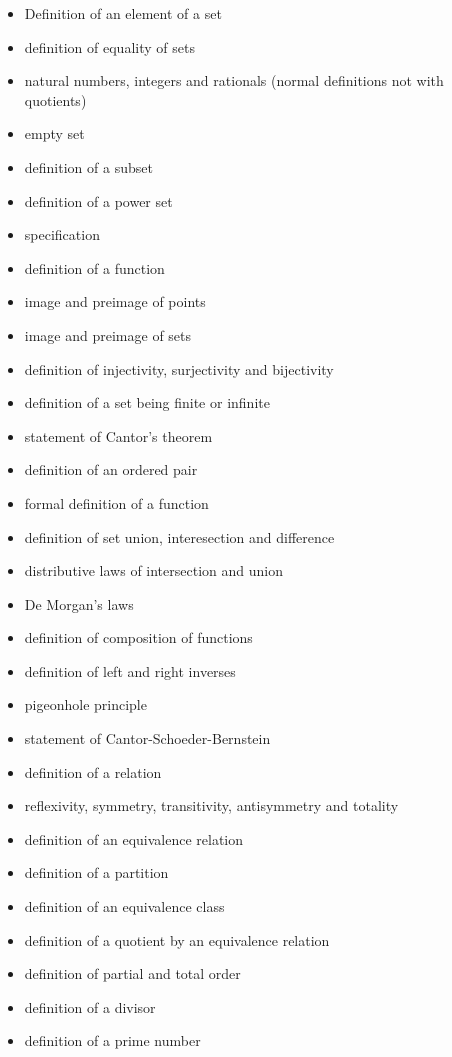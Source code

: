 \documentclass[
]{book}
\providecommand{\tightlist}{%
  \setlength{\itemsep}{0pt}\setlength{\parskip}{0pt}}
\theoremstyle{definition}
\theoremstyle{definition}
\theoremstyle{definition}
\theoremstyle{definition}
\theoremstyle{remark}
\begin{document}
\begin{itemize}
\tightlist
\item
  Definition of an element of a set
\item
  definition of equality of sets
\item
  natural numbers, integers and rationals (normal definitions not with quotients)
\item
  empty set
\item
  definition of a subset
\item
  definition of a power set
\item
  specification
\item
  definition of a function
\item
  image and preimage of points
\item
  image and preimage of sets
\item
  definition of injectivity, surjectivity and bijectivity
\item
  definition of a set being finite or infinite
\item
  statement of Cantor's theorem
\item
  definition of an ordered pair
\item
  formal definition of a function
\item
  definition of set union, interesection and difference
\item
  distributive laws of intersection and union
\item
  De Morgan's laws
\item
  definition of composition of functions
\item
  definition of left and right inverses
\item
  pigeonhole principle
\item
  statement of Cantor-Schoeder-Bernstein
\item
  definition of a relation
\item
  reflexivity, symmetry, transitivity, antisymmetry and totality
\item
  definition of an equivalence relation
\item
  definition of a partition
\item
  definition of an equivalence class
\item
  definition of a quotient by an equivalence relation
\item
  definition of partial and total order
\item
  definition of a divisor
\item
  definition of a prime number

\end{itemize}
\end{document}
